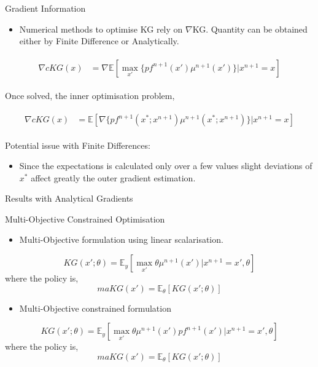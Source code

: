 \documentclass{beamer}
\begin{document}
\begin{frame}{Gradient Information}

\begin{itemize}
	\item Numerical methods to optimise KG rely on $\nabla$KG. Quantity can be obtained either by Finite Difference or Analytically. 
\end{itemize}

\begin{align*}
\begin{split}
\nabla cKG(x) &= \nabla \mathbb{E}[\max_{x'}\{pf^{n+1}(x')\mu^{n+1}(x')\}|x^{n+1}=x]
\end{split}
\end{align*}

Once solved, the inner optimisation problem, 

\begin{align*}
\begin{split}
\nabla cKG(x) &= \mathbb{E}[\nabla \{pf^{n+1}(x^{*};x^{n+1})\mu^{n+1}(x^{*};x^{n+1})\}|x^{n+1}=x]
\end{split}
\end{align*}

Potential issue with Finite Differences:
\begin{itemize}
	\item Since the expectations is calculated only over a few values slight deviations of $x^{*}$ affect greatly the outer gradient estimation. 
\end{itemize}

\end{frame}


\begin{frame}{Results with Analytical Gradients}

\end{frame}

\begin{frame}{Multi-Objective Constrained Optimisation}

\begin{itemize}
	\item Multi-Objective formulation using linear scalarisation.
\end{itemize}

$$
KG(x';\theta) = \mathbb{E}_{y}[\max_{x'}\theta\mu^{n+1}(x')|x^{n+1}=x',\theta]
$$
where the policy is,
$$
maKG(x') = \mathbb{E}_{\theta}[KG(x';\theta)]
$$

\begin{itemize}
	\item Multi-Objective constrained formulation
\end{itemize}

$$
KG(x';\theta) = \mathbb{E}_{y}[\max_{x'}\theta\mu^{n+1}(x')pf^{n+1}(x')|x^{n+1}=x',\theta]
$$
where the policy is,
$$
maKG(x') = \mathbb{E}_{\theta}[KG(x';\theta)]
$$


\end{frame}
\end{document}
